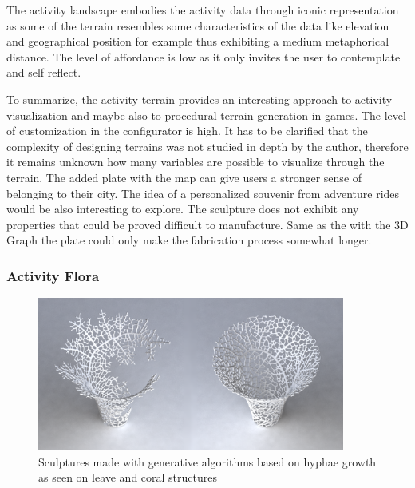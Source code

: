 \documentclass[../medieninformatik-arbeit.tex]{subfiles}
\begin{document}
The activity landscape embodies the activity data through iconic representation as some of the terrain resembles some characteristics of the data like elevation and geographical position for example thus exhibiting a medium metaphorical distance. The level of affordance is low as it only invites the user to contemplate and self reflect. 

To summarize, the activity terrain provides an interesting approach to activity visualization and maybe also to procedural terrain generation in games. The level of customization in the configurator is high. It has to be clarified that the complexity of designing terrains was not studied in depth by the author, therefore it remains unknown how many variables are possible to visualize through the terrain. The added plate with the map can give users a stronger sense of belonging to their city. The idea of a personalized souvenir from adventure rides would be also interesting to explore. The sculpture does not exhibit any properties that could be proved difficult to manufacture. Same as the with the 3D Graph the plate could only make the fabrication process somewhat longer.  

\subsubsection{Activity Flora}

\begin{figure}[h]
\captionsetup{width=0.9\textwidth}
\begin{center}
  \includegraphics[width=0.9\textwidth]{Prototype/img/nervous}
  \caption{Sculptures made with generative algorithms based on hyphae growth as seen on leave and coral structures\cite{nervous}}
\label{fig:nervous}
\end{center}
\end{figure}
\end{document}
